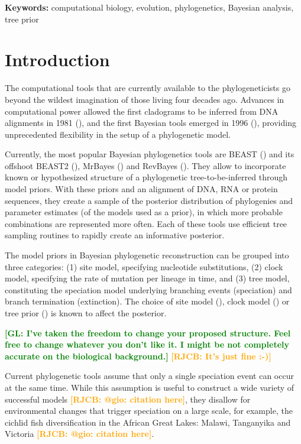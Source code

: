 \documentclass{article}
\newcommand*\richel[1]{\textcolor{orange}{\textbf{[RJCB: #1]}}}
\newcommand*\gio[1]{\textcolor{green}{\textbf{[GL: #1]}}}
\begin{document}
{\bf Keywords:} computational biology, evolution, phylogenetics, Bayesian analysis, tree prior

\section{Introduction}

The computational tools that are currently available 
to the phylogeneticists go beyond the wildest 
imagination of those living four decades ago.
Advances in computational power allowed the first cladograms to be inferred 
from DNA alignments in 1981 (\cite{felsenstein1981}), and  
the first Bayesian tools emerged in 1996 (\cite{rannala1996}),
providing unprecedented flexibility in the setup of a phylogenetic model.

Currently, the most popular Bayesian phylogenetics tools are
BEAST (\cite{beast}) and its offshoot BEAST2 (\cite{beast2}), 
MrBayes (\cite{mrbayes}) and RevBayes (\cite{revbayes}). 
They allow to incorporate known or hypothesized structure of a phylogenetic 
tree-to-be-inferred through model priors. 
With these priors and an alignment of DNA, RNA or protein sequences, 
they create a sample of the posterior distribution
of phylogenies and parameter estimates (of the models used as a prior), 
in which more probable combinations are represented more often.
Each of these tools use efficient tree sampling routines to rapidly create an 
informative posterior.

The model priors in Bayesian phylogenetic reconstruction 
can be grouped into three categories: (1) site model, specifying 
nucleotide substitutions, (2) clock model, specifying
the rate of mutation per lineage in time, and (3) tree model, 
constituting the speciation model underlying branching events (speciation) 
and branch termination (extinction).
The choice of site model (\cite{posada_and_buckley_2004}), 
clock model (\cite{baele_et_al_2012}) 
or tree prior (\cite{moller2018, yang_and_ranalla_2005}) is known to affect
the posterior.

\gio{I've taken the freedom to change your proposed structure. Feel free to change whatever you don't like it. I might be not completely accurate on the biological background.}
\richel{It's just fine :-)}

Current phylogenetic tools assume that only a single speciation event can occur at the same time.
While this assumption is useful to construct a wide variety of successful models \richel{@gio: citation here},
they disallow for environmental changes that trigger speciation on a large scale,
for example, the cichlid fish diversification in the 
African Great Lakes: Malawi, Tanganyika and Victoria \richel{@gio: citation here}.
\end{document}
